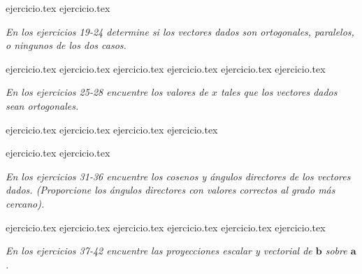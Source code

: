 \begin{enumerate}
    \setcounter{enumi}{16}
    {ejercicio.tex}
{ejercicio.tex}
\end{enumerate}

\vspace{0.3cm}
\noindent\textit{En los ejercicios 19-24 determine si los vectores dados son ortogonales, paralelos, o ningunos de los dos casos.}

\begin{enumerate}
    \setcounter{enumi}{18}
    {ejercicio.tex}
{ejercicio.tex}
{ejercicio.tex}
{ejercicio.tex}
{ejercicio.tex}
{ejercicio.tex}
\end{enumerate}

\vspace{0.3cm}
\noindent\textit{En los ejercicios 25-28 encuentre los valores de $x$ tales que los vectores dados sean ortogonales.}

\begin{enumerate}
    \setcounter{enumi}{24}
    {ejercicio.tex}
{ejercicio.tex}
{ejercicio.tex}
{ejercicio.tex}
\end{enumerate}

\vspace{0.3cm}
\begin{enumerate}
    \setcounter{enumi}{28}
    {ejercicio.tex}
{ejercicio.tex}
\end{enumerate}

\vspace{0.3cm}
\noindent\textit{En los ejercicios 31-36 encuentre los cosenos y ángulos directores de los vectores dados. (Proporcione los ángulos directores con valores correctos al grado más cercano).}

\begin{enumerate}
    \setcounter{enumi}{30}
    {ejercicio.tex}
{ejercicio.tex}
{ejercicio.tex}
{ejercicio.tex}
{ejercicio.tex}
{ejercicio.tex}
\end{enumerate}

\vspace{0.3cm}
\noindent\textit{En los ejercicios 37-42 encuentre las proyecciones escalar y vectorial de $\mathbf{b}$ sobre $\mathbf{a}$.}

